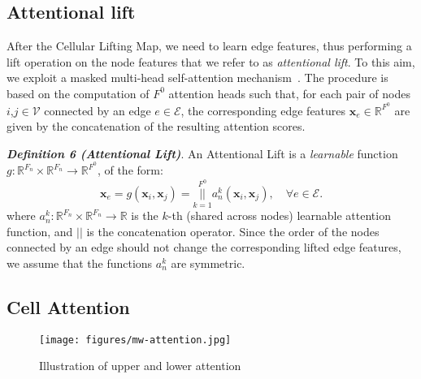 \documentclass{article}
\begin{document}
\subsection{Attentional lift}
 After the Cellular Lifting Map, we need to learn edge features, thus performing a lift operation on the node features that we refer to as \emph{attentional lift}. To this aim, we exploit a masked multi-head self-attention mechanism~\cite{velivckovic2017graph}. The procedure is based on the computation of $F^0$ attention heads such that, for each pair of nodes $i$,$j \in \mathcal{V}$ connected by an edge $e \in \mathcal{E}$, the corresponding edge features $\mathbf{x}_{e} \in \mathbb{R}^{F^0}$ are given by the concatenation of the resulting attention scores.

\textit{\textbf{Definition 6 (Attentional Lift)}}. An Attentional Lift is a \emph{learnable} function $g: \mathbb{R}^{F_n} \times \mathbb{R}^{F_n} \rightarrow \mathbb{R}^{F^0}$,  of the form: 
\begin{equation}\label{eq:attentional_lift}
    \mathbf{x}_{e} =g(\mathbf{x}_i,\mathbf{x}_j)= \overset{F^0}{\underset{k=1}{||}}a_n^k(\mathbf{x}_i,\mathbf{x}_j), \quad \forall e \in \mathcal{E}.
\end{equation}
where $a_n^k: \mathbb{R}^{F_n} \times \mathbb{R}^{F_n}  \rightarrow \mathbb{R}$ is the $k$-th (shared across nodes) learnable attention function, and $||$ is the concatenation operator. Since the order of the nodes connected by an edge should not change the corresponding lifted edge features, we assume that the functions $a_n^k$ are symmetric. 

\subsection{Cell Attention}

\begin{figure}[t]
    \centering
    \texttt{[image: figures/mw-attention.jpg]}
    \caption{Illustration of upper and lower attention}
    \label{fig:att}
\end{figure}
\end{document}
